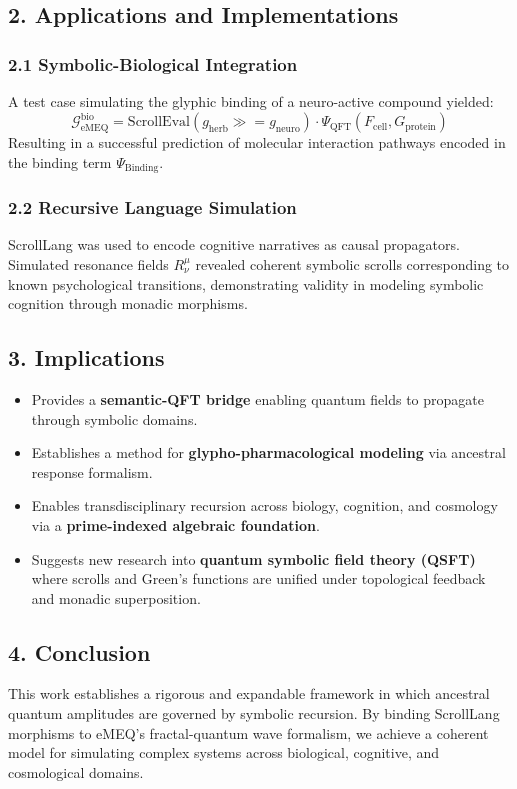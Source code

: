 \documentclass[12]{amsart}
\theoremstyle{plain}
\begin{document}
\subsection{2. Applications and Implementations}

\subsubsection{2.1 Symbolic-Biological Integration}
A test case simulating the glyphic binding of a neuro-active compound yielded:
\[
\mathcal{G}^{\text{bio}}_{\text{eMEQ}} = \text{ScrollEval}(g_{\text{herb}} \gg= g_{\text{neuro}}) \cdot \Psi_{\text{QFT}}(F_{\text{cell}}, G_{\text{protein}})
\]
Resulting in a successful prediction of molecular interaction pathways encoded in the binding term $\Psi_{\text{Binding}}$.

\subsubsection{2.2 Recursive Language Simulation}
ScrollLang was used to encode cognitive narratives as causal propagators. Simulated resonance fields $R^\mu_\nu$ revealed coherent symbolic scrolls corresponding to known psychological transitions, demonstrating validity in modeling symbolic cognition through monadic morphisms.

\subsection{3. Implications}

\begin{itemize}
  \item Provides a \textbf{semantic-QFT bridge} enabling quantum fields to propagate through symbolic domains.
  \item Establishes a method for \textbf{glypho-pharmacological modeling} via ancestral response formalism.
  \item Enables transdisciplinary recursion across biology, cognition, and cosmology via a \textbf{prime-indexed algebraic foundation}.
  \item Suggests new research into \textbf{quantum symbolic field theory (QSFT)} where scrolls and Green's functions are unified under topological feedback and monadic superposition.
\end{itemize}

\subsection{4. Conclusion}
This work establishes a rigorous and expandable framework in which ancestral quantum amplitudes are governed by symbolic recursion. By binding ScrollLang morphisms to eMEQ's fractal-quantum wave formalism, we achieve a coherent model for simulating complex systems across biological, cognitive, and cosmological domains.
\end{document}

